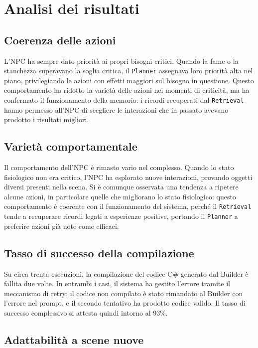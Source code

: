 \section{Analisi dei risultati}

\subsection{Coerenza delle azioni}

L'NPC ha sempre dato priorità ai propri bisogni critici. Quando la fame o la stanchezza superavano la soglia critica, il \texttt{Planner} assegnava loro priorità alta nel piano, privilegiando le azioni con effetti maggiori sul bisogno in questione. Questo comportamento ha ridotto la varietà delle azioni nei momenti di criticità, ma ha confermato il funzionamento della memoria: i ricordi recuperati dal \texttt{Retrieval} hanno permesso all'NPC di scegliere le interazioni che in passato avevano prodotto i risultati migliori.

\subsection{Varietà comportamentale}

Il comportamento dell'NPC è rimasto vario nel complesso. Quando lo stato fisiologico non era critico, l'NPC ha esplorato nuove interazioni, provando oggetti diversi presenti nella scena. Si è comunque osservata una tendenza a ripetere alcune azioni, in particolare quelle che migliorano lo stato fisiologico: questo comportamento è coerente con il funzionamento del sistema, perché il \texttt{Retrieval} tende a recuperare ricordi legati a esperienze positive, portando il \texttt{Planner} a preferire azioni già note come efficaci.

\subsection{Tasso di successo della compilazione}

Su circa trenta esecuzioni, la compilazione del codice C\# generato dal Builder è fallita due volte. In entrambi i casi, il sistema ha gestito l'errore tramite il meccanismo di retry: il codice non compilato è stato rimandato al Builder con l'errore nel prompt, e il secondo tentativo ha prodotto codice valido. Il tasso di successo complessivo si attesta quindi intorno al 93\%.

\subsection{Adattabilità a scene nuove}

